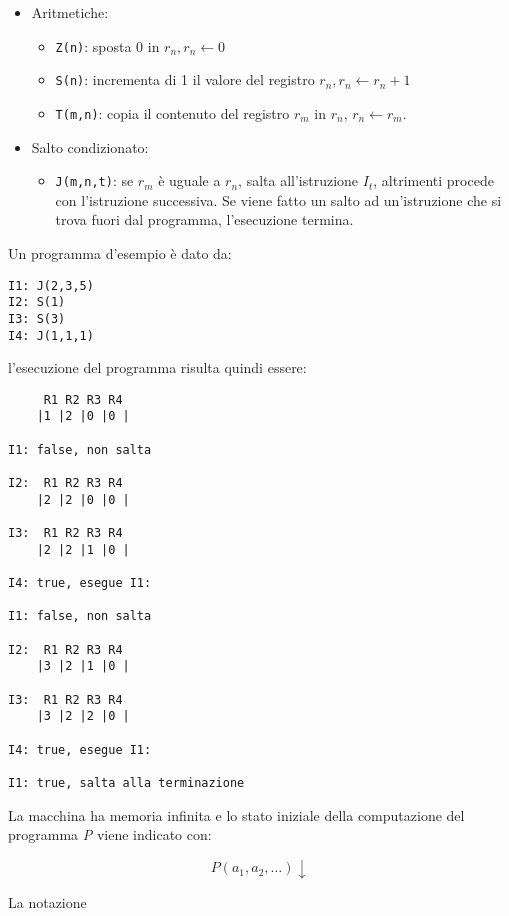 \begin{itemize}
\item
  Aritmetiche:
  \begin{itemize}
  \item \texttt{Z(n)}: sposta 0 in $r_n, r_n \gets 0 $
  \item \texttt{S(n)}: incrementa di 1 il valore del registro $ r_n, r_n \gets r_n +1 $
  \item \texttt{T(m,n)}: copia il contenuto del registro $r_m$ in $r_n$, $ r_n \gets r_m$.
  \end{itemize}
\item Salto condizionato:
  \begin{itemize}
  \item \texttt{J(m,n,t)}: se $ r_m $ è uguale a $ r_n $, salta all'istruzione $ I_t  $, altrimenti procede con l'istruzione successiva. 
	  Se viene fatto un salto ad un'istruzione che si trova fuori dal programma, l'esecuzione termina.
  \end{itemize}
\end{itemize}

Un programma d'esempio è dato da:

\begin{lstlisting}[language=URM]
I1: J(2,3,5)
I2: S(1)
I3: S(3)
I4: J(1,1,1)
\end{lstlisting}

l'esecuzione del programma risulta quindi essere:

\begin{verbatim}
     R1 R2 R3 R4
    |1 |2 |0 |0 |

I1: false, non salta

I2:  R1 R2 R3 R4
    |2 |2 |0 |0 |
    
I3:  R1 R2 R3 R4
    |2 |2 |1 |0 |

I4: true, esegue I1:

I1: false, non salta

I2:  R1 R2 R3 R4
    |3 |2 |1 |0 |
    
I3:  R1 R2 R3 R4
    |3 |2 |2 |0 |

I4: true, esegue I1:

I1: true, salta alla terminazione
\end{verbatim}

La macchina ha memoria infinita e lo stato iniziale della computazione
del programma \emph{P} viene indicato con:

$$
P(a_1, a_2, \ldots)\downarrow
$$

La notazione

